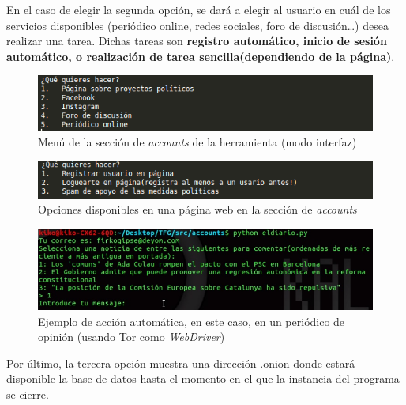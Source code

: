 En el caso de elegir la segunda opción, se dará a elegir al usuario en cuál de los servicios disponibles (periódico online, redes sociales, foro de discusión\dots) desea realizar una tarea. Dichas tareas son \textbf{registro automático, inicio de sesión automático, o realización de tarea sencilla(dependiendo de la página)}.

\begin{figure}[h]
	\centerline{
		\mbox{\includegraphics[width=5.00in]{images/accounts.png}}
	}
	\caption{Menú de la sección de \textit{accounts} de la herramienta (modo interfaz)}
	\label{fig:accounts}
\end{figure}

\begin{figure}[h]
	\centerline{
		\mbox{\includegraphics[width=5.00in]{images/medidas_politicas.png}}
	}
	\caption{Opciones disponibles en una página web en la sección de \textit{accounts}}
	\label{fig:medidas}
\end{figure}

\begin{figure}[h]
	\centerline{
		\mbox{\includegraphics[width=5.00in]{images/eldiario.png}}
	}
	\caption{Ejemplo de acción automática, en este caso, en un periódico de opinión (usando Tor como \textit{WebDriver})}
	\label{fig:eldiario}
\end{figure}


Por último, la tercera opción muestra una dirección .onion donde estará disponible la base de datos hasta el momento en el que la instancia del programa se cierre.

\newpage \thispagestyle{empty} %